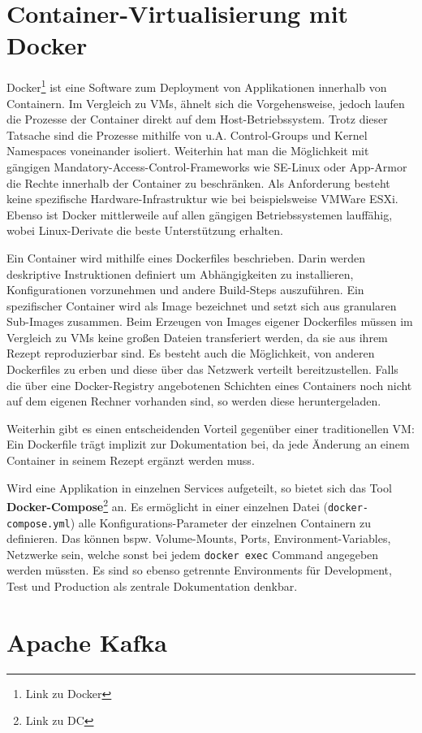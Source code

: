 \section{Container-Virtualisierung mit Docker}
Docker\footnote{Link zu Docker} ist eine Software zum Deployment von Applikationen innerhalb von Containern.
Im Vergleich zu \acp{VM}, ähnelt sich die Vorgehensweise, jedoch laufen die Prozesse der Container direkt auf dem Host-Betriebssystem.
Trotz dieser Tatsache sind die Prozesse mithilfe von \ac{u.A.} Control-Groups und Kernel Namespaces voneinander isoliert.
Weiterhin hat man die Möglichkeit mit gängigen Mandatory-Access-Control-Frameworks wie SE-Linux oder App-Armor die Rechte innerhalb der Container zu beschränken.
Als Anforderung besteht keine spezifische Hardware-Infrastruktur wie bei beispielsweise VMWare ESXi.
Ebenso ist Docker mittlerweile auf allen gängigen Betriebssystemen lauffähig, wobei Linux-Derivate die beste Unterstützung erhalten.
\par
Ein Container wird mithilfe eines Dockerfiles beschrieben.
Darin werden deskriptive Instruktionen definiert um Abhängigkeiten zu installieren, Konfigurationen vorzunehmen und andere Build-Steps auszuführen.
Ein spezifischer Container wird als Image bezeichnet und setzt sich aus granularen Sub-Images zusammen.
Beim Erzeugen von Images eigener Dockerfiles müssen im Vergleich zu \acp{VM} keine großen Dateien transferiert werden, da sie aus ihrem Rezept reproduzierbar sind. 
Es besteht auch die Möglichkeit, von anderen Dockerfiles zu erben und diese über das Netzwerk verteilt bereitzustellen.
Falls die über eine Docker-Registry angebotenen Schichten eines Containers noch nicht auf dem eigenen Rechner vorhanden sind, so werden diese heruntergeladen.
\par
Weiterhin gibt es einen entscheidenden Vorteil gegenüber einer traditionellen \ac{VM}: Ein Dockerfile trägt implizit zur Dokumentation bei, da jede Änderung an einem Container in seinem Rezept ergänzt werden muss.
\par
Wird eine Applikation in einzelnen Services aufgeteilt, so bietet sich das Tool \textbf{Docker-Compose}\footnote{Link zu DC} an.
Es ermöglicht in einer einzelnen Datei (\texttt{docker-compose.yml}) alle Konfigurations-Parameter der einzelnen Containern zu definieren.
Das können \ac{bspw.} Volume-Mounts, Ports, Environment-Variables, Netzwerke sein, welche sonst bei jedem \texttt{docker exec} Command angegeben werden müssten.
Es sind so ebenso getrennte Environments für Development, Test und Production als zentrale Dokumentation denkbar.

\section{Apache Kafka}


